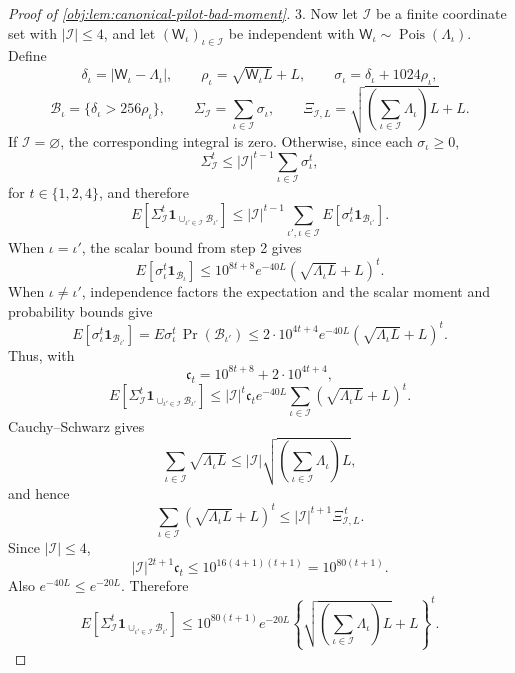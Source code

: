 \begin{proof}[Proof of \cref{obj:lem:canonical-pilot-bad-moment}]
3.  Now let \(\mathcal I\) be a finite coordinate set with
\(|\mathcal I|\le4\), and let
\((\mathsf W_\iota)_{\iota\in\mathcal I}\) be independent with
\(\mathsf W_\iota\sim\operatorname{Pois}(\Lambda_\iota)\).  Define
\[
\delta_\iota=|\mathsf W_\iota-\Lambda_\iota|,
\qquad
\rho_\iota=\sqrt{\mathsf W_\iota L}+L,
\qquad
\sigma_\iota=\delta_\iota+1024\rho_\iota,
\]
\[
\mathcal B_\iota=\{\delta_\iota>256\rho_\iota\},
\qquad
\Sigma_{\mathcal I}=\sum_{\iota\in\mathcal I}\sigma_\iota,
\qquad
\Xi_{\mathcal I,L}
=
\sqrt{\left(\sum_{\iota\in\mathcal I}\Lambda_\iota\right)L}+L .
\]
If \(\mathcal I=\varnothing\), the corresponding integral is zero.  Otherwise,
since each \(\sigma_\iota\ge0\),
\[
\Sigma_{\mathcal I}^t
\le
|\mathcal I|^{t-1}
\sum_{\iota\in\mathcal I}\sigma_\iota^t ,
\]
for \(t\in\{1,2,4\}\), and therefore
\[
E\!\left[
\Sigma_{\mathcal I}^t
\mathbf 1_{\cup_{\iota'\in\mathcal I}\mathcal B_{\iota'}}
\right]
\le
|\mathcal I|^{t-1}
\sum_{\iota',\iota\in\mathcal I}
E\!\left[
\sigma_\iota^t\mathbf 1_{\mathcal B_{\iota'}}
\right].
\]
When \(\iota=\iota'\), the scalar bound from step 2 gives
\[
E\!\left[\sigma_\iota^t\mathbf 1_{\mathcal B_\iota}\right]
\le
10^{8t+8}e^{-40L}
\left(\sqrt{\Lambda_\iota L}+L\right)^t.
\]
When \(\iota\ne\iota'\), independence factors the expectation and the scalar
moment and probability bounds give
\[
E\!\left[
\sigma_\iota^t\mathbf 1_{\mathcal B_{\iota'}}
\right]
=
E\sigma_\iota^t\,\Pr(\mathcal B_{\iota'})
\le
2\cdot10^{4t+4}e^{-40L}
\left(\sqrt{\Lambda_\iota L}+L\right)^t.
\]
Thus, with
\[
\mathfrak c_t=10^{8t+8}+2\cdot10^{4t+4},
\]
\[
E\!\left[
\Sigma_{\mathcal I}^t
\mathbf 1_{\cup_{\iota'\in\mathcal I}\mathcal B_{\iota'}}
\right]
\le
|\mathcal I|^t\mathfrak c_t e^{-40L}
\sum_{\iota\in\mathcal I}
\left(\sqrt{\Lambda_\iota L}+L\right)^t .
\]
Cauchy--Schwarz gives
\[
\sum_{\iota\in\mathcal I}\sqrt{\Lambda_\iota L}
\le
|\mathcal I|
\sqrt{\left(\sum_{\iota\in\mathcal I}\Lambda_\iota\right)L},
\]
and hence
\[
\sum_{\iota\in\mathcal I}
\left(\sqrt{\Lambda_\iota L}+L\right)^t
\le
|\mathcal I|^{t+1}\Xi_{\mathcal I,L}^{\,t}.
\]
Since \(|\mathcal I|\le4\),
\[
|\mathcal I|^{2t+1}\mathfrak c_t
\le
10^{16(4+1)(t+1)}
=
10^{80(t+1)}.
\]
Also \(e^{-40L}\le e^{-20L}\).  Therefore
\[
E\!\left[
\Sigma_{\mathcal I}^t
\mathbf 1_{\cup_{\iota'\in\mathcal I}\mathcal B_{\iota'}}
\right]
\le
10^{80(t+1)}e^{-20L}
\left\{
\sqrt{\left(\sum_{\iota\in\mathcal I}\Lambda_\iota\right)L}+L
\right\}^{t}.
\]


\end{proof}
